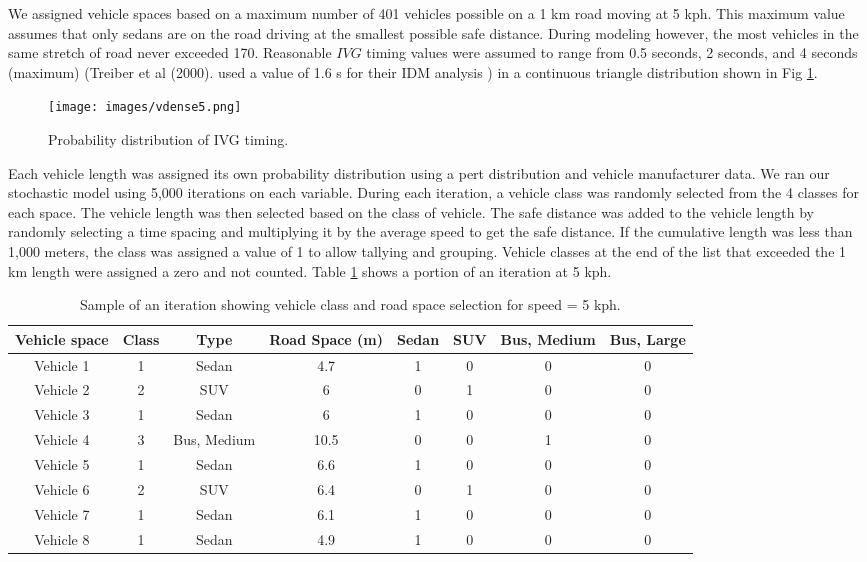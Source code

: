 We assigned vehicle spaces based on a maximum number of 401 vehicles possible on a 1 km road moving at 5 kph.  This maximum value assumes that only sedans are on the road driving at the smallest possible safe distance.  During modeling however, the most vehicles in the same stretch of road never exceeded 170.  Reasonable $IVG$ timing values were assumed to range from 0.5 seconds, 2 seconds, and 4 seconds (maximum) (Treiber et al (2000). used a value of 1.6 s for their IDM analysis \citep{Treiber2000}) in a continuous triangle distribution shown in Fig \ref{fig5:IVGobs}.
 
%
\begin{figure}
\texttt{[image: images/vdense5.png]} 
\caption{Probability distribution of IVG timing.}
\label{fig5:IVGobs}
\end{figure}
%

Each vehicle length was assigned its own probability distribution using a pert distribution and vehicle manufacturer data.  We ran our stochastic model using 5,000 iterations on each variable. 
During each iteration, a vehicle class was randomly selected from the 4 classes for each space.  The vehicle length was then selected based on the class of vehicle.  The safe distance was added to the vehicle length by randomly selecting a time spacing and multiplying it by the average speed to get the safe distance.  If the cumulative length was less than 1,000 meters, the class was assigned a value of 1 to allow tallying and grouping.  Vehicle classes at the end of the list that exceeded the 1 km length were assigned a zero and not counted.  Table \ref{tb3:selection} shows a portion of an iteration at 5 kph. 

\begin{table}[]
\centering
\caption{Sample of an iteration showing vehicle class and road space selection for speed = 5 kph.}
\label{tb3:selection}
\begin{tabular}{@{}cccccccc@{}}
\toprule
\textbf{Vehicle space} & \textbf{Class} & \textbf{Type} & \textbf{Road Space (m)} & \textbf{Sedan} & \textbf{SUV} & \textbf{Bus, Medium} & \textbf{Bus, Large} \\ \midrule
Vehicle 1 & 1 & Sedan & 4.7 & 1 & 0 & 0 & 0 \\
Vehicle 2 & 2 & SUV & 6 & 0 & 1 & 0 & 0 \\
Vehicle 3 & 1 & Sedan & 6 & 1 & 0 & 0 & 0 \\
Vehicle 4 & 3 & Bus, Medium & 10.5 & 0 & 0 & 1 & 0 \\
Vehicle 5 & 1 & Sedan & 6.6 & 1 & 0 & 0 & 0 \\
Vehicle 6 & 2 & SUV & 6.4 & 0 & 1 & 0 & 0 \\
Vehicle 7 & 1 & Sedan & 6.1 & 1 & 0 & 0 & 0 \\
Vehicle 8 & 1 & Sedan & 4.9 & 1 & 0 & 0 & 0 \\ \bottomrule
\end{tabular}
\end{table}
\clearpage
